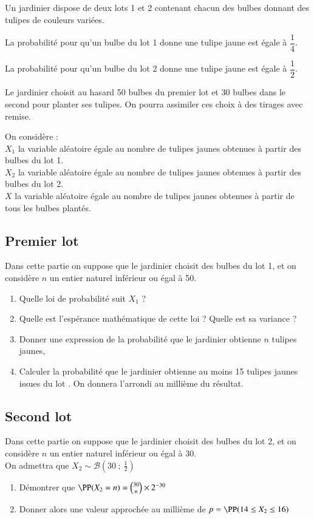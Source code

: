 \documentclass[oneside,12pt]{article}
\begin{document}
Un jardinier dispose de deux lots 1 et 2 contenant chacun des bulbes donnant des tulipes de couleurs variées.

La probabilité pour qu'un bulbe du lot 1 donne une tulipe jaune est égale à $\dfrac{1}{4}$.

La probabilité pour qu'un bulbe du lot 2 donne une tulipe jaune est égale à $\dfrac{1}{2}$.

Le jardinier choisit au hasard 50 bulbes du premier lot et 30 bulbes dans le second pour planter ses tulipes. On pourra assimiler ces choix à des tirages avec remise.

On considère :\\
$X_1$ la variable aléatoire égale au nombre de tulipes jaunes obtenues à partir des bulbes du lot 1.\\
$X_2$ la variable aléatoire égale au nombre de tulipes jaunes obtenues à partir des bulbes du lot 2.\\
$X$ la variable aléatoire égale au nombre de tulipes jaunes obtenues à partir de tous les bulbes plantés.

\subsection{Premier lot}
Dans cette partie on suppose que le jardinier choisit des bulbes du lot 1, et on considère $n$ un entier naturel inférieur ou égal à 50.
\begin{enumerate}
    \item Quelle loi de probabilité suit $X_1$ ?
    \item Quelle est l'espérance mathématique de cette loi ? Quelle est sa variance ?
    \item Donner une expression de la probabilité que le jardinier obtienne $n$ tulipes jaunes,
    \item Calculer la probabilité que le jardinier obtienne au moins 15 tulipes jaunes issues du lot . On donnera l'arrondi au millième du résultat.
\end{enumerate}

\subsection{Second lot}
Dans cette partie on suppose que le jardinier choisit des bulbes du lot 2, et on considère $n$ un entier naturel inférieur ou égal à 30.\\
On admettra que $X_2\sim\mathcal{B}\left(30~;~\frac{1}{2}\right)$ 
\begin{enumerate}
    \item Démontrer que $\PP(X_2=n)=\binom{30}{n}\times2^{-30}$
    \item Donner alors une valeur approchée au millième de $p=\PP(14\leq X_2 \leq 16)$
\end{enumerate}
\end{document}

